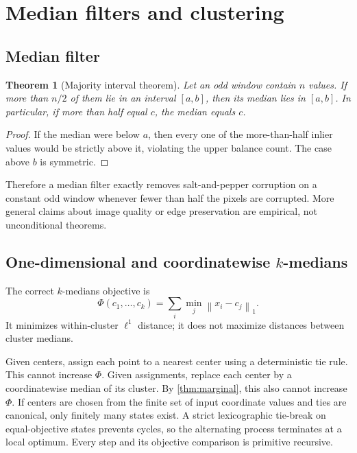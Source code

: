 \documentclass[11pt]{article}
\newtheorem{theorem}{Theorem}[section]
\newcommand{\norm}[1]{\left\lVert#1\right\rVert}
\begin{document}
\section{Median filters and clustering}

\subsection{Median filter}

\begin{theorem}[Majority interval theorem]\label{thm:majority-filter}
Let an odd window contain $n$ values.  If more than $n/2$ of them lie in an
interval $[a,b]$, then its median lies in $[a,b]$.  In particular, if more than
half equal $c$, the median equals $c$.
\end{theorem}

\begin{proof}
If the median were below $a$, then every one of the more-than-half inlier
values would be strictly above it, violating the upper balance count.  The
case above $b$ is symmetric.
\end{proof}

Therefore a median filter exactly removes salt-and-pepper corruption on a
constant odd window whenever fewer than half the pixels are corrupted.  More
general claims about image quality or edge preservation are empirical, not
unconditional theorems.

\subsection{One-dimensional and coordinatewise $k$-medians}

The correct $k$-medians objective is
\[
 \Phi(c_1,\ldots,c_k)=\sum_i\min_j\norm{x_i-c_j}_1.
\]
It minimizes within-cluster $\ell^1$ distance; it does not maximize distances
between cluster medians.

Given centers, assign each point to a nearest center using a deterministic tie
rule.  This cannot increase $\Phi$.  Given assignments, replace each center by
a coordinatewise median of its cluster.  By \cref{thm:marginal}, this also
cannot increase $\Phi$.  If centers are chosen from the finite set of input
coordinate values and ties are canonical, only finitely many states exist.
A strict lexicographic tie-break on equal-objective states prevents cycles, so
the alternating process terminates at a local optimum.  Every step and its
objective comparison is primitive recursive.
\end{document}
